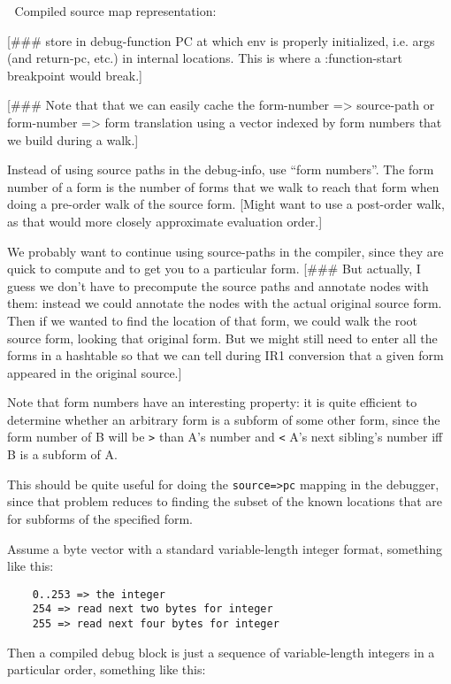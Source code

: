 
Compiled source map representation:

[\#\#\# store in debug-function PC at which env is properly initialized, i.e.
args (and return-pc, etc.) in internal locations.  This is where a
:function-start breakpoint would break.]

[\#\#\# Note that that we can easily cache the form-number => source-path or
form-number => form translation using a vector indexed by form numbers that we
build during a walk.]




Instead of using source paths in the debug-info, use ``form numbers''.  The form
number of a form is the number of forms that we walk to reach that form when
doing a pre-order walk of the source form.  [Might want to use a post-order
walk, as that would more closely approximate evaluation order.]


We probably want to continue using source-paths in the compiler, since they are
quick to compute and to get you to a particular form.  [\#\#\# But actually, I
guess we don't have to precompute the source paths and annotate nodes with
them: instead we could annotate the nodes with the actual original source form.
Then if we wanted to find the location of that form, we could walk the root
source form, looking that original form.  But we might still need to enter all
the forms in a hashtable so that we can tell during IR1 conversion that a given
form appeared in the original source.]


Note that form numbers have an interesting property: it is quite efficient to
determine whether an arbitrary form is a subform of some other form, since the
form number of B will be \verb+>+ than A's number and \verb+<+ A's next sibling's number iff
B is a subform of A.  

This should be quite useful for doing the \verb|source=>pc| mapping in the debugger,
since that problem reduces to finding the subset of the known locations that
are for subforms of the specified form.


Assume a byte vector with a standard variable-length integer format, something
like this:

\begin{verbatim}
    0..253 => the integer
    254 => read next two bytes for integer
    255 => read next four bytes for integer
\end{verbatim}

Then a compiled debug block is just a sequence of variable-length integers in a
particular order, something like this:

